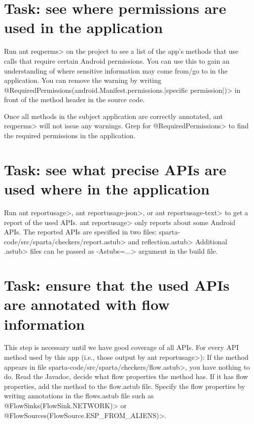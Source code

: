 \section{Task: see where permissions are used in the application}

Run \<ant reqperms> on the project to see a list of the app's methods
that use calls that require certain Android permissions. You can use
this to gain an understanding of where sensitive information may come
from/go to in the application. You can remove the warning by writing
\<@RequiredPermissions({android.Manifest.permissions.|specific
permission|})> in front of the method header in the source code.

Once all methods in the subject application are correctly annotated,
\<ant reqperms> will not issue any warnings.
Grep for \<@RequiredPermissions> to find the required permissions
in the application.





\section{Task: see what precise APIs are used where in the application}

Run \<ant reportusage>, \<ant reportusage-json>, or \<ant
reportusage-text> to get a report of the used APIs.
\<ant reportusage> only reports about some Android APIs.
The reported APIs are specified in two files:
\<sparta-code/src/sparta/checkers/report.astub> and \<reflection.astub>
Additional \<.astub> files can be passed as \<-Astubs=...> argument in the
build file.


\section{Task: ensure that the used APIs are annotated with flow information}

This step is necessary until we have good coverage of all APIs.
For every API method used by this app (i.e., those output by \<ant
reportusage>):
If the method appears in file
\<sparta-code/src/sparta/checkers/flow.astub>, you have nothing to do.
Read the Javadoc, decide what flow properties the method has.
If it has flow properties, add the method to the flow.astub file.
Specify the flow properties by writing annotations in the flows.astub
file such as \<@FlowSinks(FlowSink.NETWORK)> or
\<@FlowSources(FlowSource.ESP\_FROM\_ALIENS)>.

